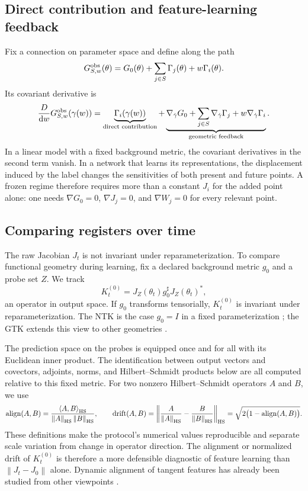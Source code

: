 \documentclass[10pt,a4paper]{article}
\newcommand{\norm}[1]{\left\lVert #1\right\rVert}
\newcommand{\inner}[2]{\left\langle #1,#2\right\rangle}
\newcommand{\dd}{\mathrm d}
\begin{document}
\subsection{Direct contribution and feature-learning feedback}
Fix a connection on parameter space and define along the path
\begin{equation}
G_{S,w}^{\rm obs}(\theta)
=G_0(\theta)+\sum_{j\in S}\Gamma_j(\theta)+w\Gamma_i(\theta).
\end{equation}
Its covariant derivative is
\begin{equation}
\frac{D}{\dd w}G_{S,w}^{\rm obs}(\gamma(w))
=
\underbrace{\Gamma_i(\gamma(w))}_{\text{direct contribution}}
+
\underbrace{\nabla_{\dot\gamma}G_0
+\sum_{j\in S}\nabla_{\dot\gamma}\Gamma_j
+w\nabla_{\dot\gamma}\Gamma_i}_{\text{geometric feedback}}.
\label{eq:geometric-feedback}
\end{equation}
In a linear model with a fixed background metric, the covariant derivatives in the second term vanish. In a network that learns its representations, the displacement induced by the label changes the sensitivities of both present and future points. A frozen regime therefore requires more than a constant $J_i$ for the added point alone: one needs $\nabla G_0=0$, $\nabla J_j=0$, and $\nabla W_j=0$ for every relevant point.

\subsection{Comparing registers over time}
The raw Jacobian $J_t$ is not invariant under reparameterization. To compare functional geometry during learning, fix a declared background metric $g_0$ and a probe set $Z$. We track
\begin{equation}
K_t^{(0)}=J_Z(\theta_t)g_0^\sharp J_Z(\theta_t)^*,
\label{eq:functional-kernel}
\end{equation}
an operator in output space. If $g_0$ transforms tensorially, $K_t^{(0)}$ is invariant under reparameterization. The NTK is the case $g_0=I$ in a fixed parameterization \citep{jacot2018}; the GTK extends this view to other geometries \citep{bai2025gtk}.

The prediction space on the probes is equipped once and for all with its Euclidean inner product. The identification between output vectors and covectors, adjoints, norms, and Hilbert--Schmidt products below are all computed relative to this fixed metric. For two nonzero Hilbert--Schmidt operators $A$ and $B$, we use
\begin{equation}
\operatorname{align}(A,B)
=\frac{\inner{A}{B}_{\rm HS}}{\norm A_{\rm HS}\norm B_{\rm HS}},
\qquad
\operatorname{drift}(A,B)
=\norm{\frac{A}{\norm A_{\rm HS}}-\frac{B}{\norm B_{\rm HS}}}_{\rm HS}
=\sqrt{2\bigl(1-\operatorname{align}(A,B)\bigr)}.
\label{eq:alignment-drift}
\end{equation}
These definitions make the protocol's numerical values reproducible and separate scale variation from change in operator direction. The alignment or normalized drift of $K_t^{(0)}$ is therefore a more defensible diagnostic of feature learning than $\norm{J_t-J_0}$ alone. Dynamic alignment of tangent features has already been studied from other viewpoints \citep{baratin2021}.
\end{document}
